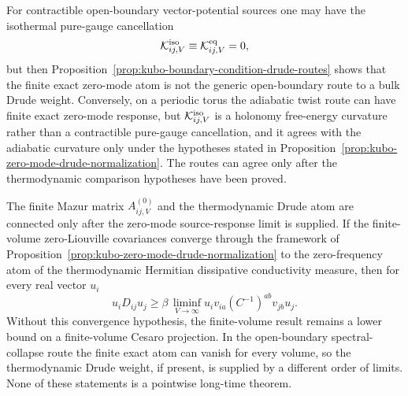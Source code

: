 For contractible open-boundary vector-potential sources one may have the
isothermal pure-gauge cancellation
\begin{equation}
  \mathcal K^{\rm iso}_{ij,V}
  \equiv
  \mathcal K^{\rm eq}_{ij,V}
  =
  0 ,
  \label{eq:kubo-equilibrium-static-puregauge-cancellation}
\end{equation}
but then Proposition~\ref{prop:kubo-boundary-condition-drude-routes} shows
that the finite exact zero-mode atom is not the generic open-boundary route
to a bulk Drude weight.  Conversely, on a periodic torus the adiabatic twist
route can have finite exact zero-mode response, but
\(\mathcal K^{\rm iso}_{ij,V}\) is a holonomy free-energy curvature rather than
a contractible pure-gauge cancellation, and it agrees with the adiabatic
curvature only under the hypotheses stated in
Proposition~\ref{prop:kubo-zero-mode-drude-normalization}.  The routes can
agree only after the thermodynamic comparison hypotheses have been proved.

The finite Mazur matrix \(A^{(0)}_{ij,V}\) and the thermodynamic Drude atom
are connected only after the zero-mode source-response limit is supplied.  If
the finite-volume zero-Liouville covariances converge through the framework
of Proposition~\ref{prop:kubo-zero-mode-drude-normalization} to the
zero-frequency atom of the thermodynamic Hermitian dissipative conductivity
measure, then for every real vector \(u_i\)
\begin{equation}
  u_iD_{ij}u_j
  \geq
  \beta\,
  \liminf_{V\to\infty}
  u_i v_{ia}(C^{-1})^{ab}v_{jb}u_j .
  \label{eq:kubo-mazur-drude-liminf-bound}
\end{equation}
Without this convergence hypothesis, the finite-volume result remains a
lower bound on a finite-volume Cesaro projection.  In the open-boundary
spectral-collapse route the finite exact atom can vanish for every volume,
so the thermodynamic Drude weight, if present, is supplied by a different
order of limits.  None of these statements is a pointwise long-time theorem.

